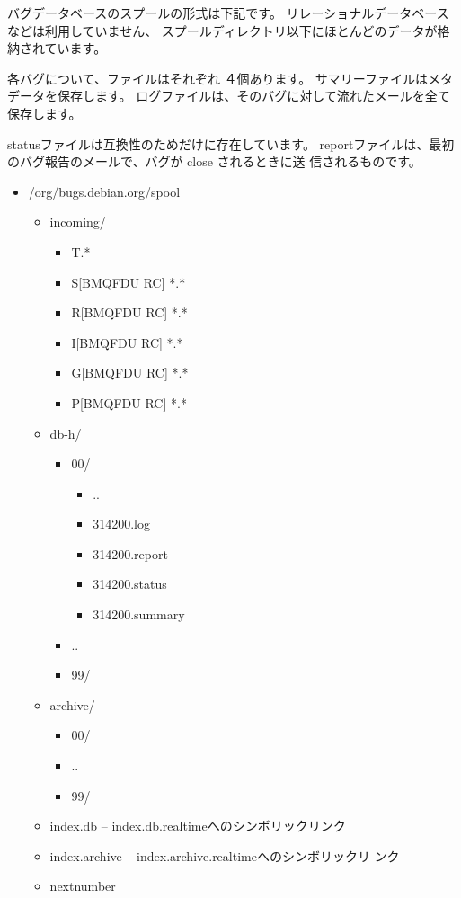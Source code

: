 \documentclass[mingoth,a4paper]{jsarticle}
\begin{document}
バグデータベースのスプールの形式は下記です。
リレーショナルデータベースなどは利用していません、
スプールディレクトリ以下にほとんどのデータが格納されています。

各バグについて、ファイルはそれぞれ
４個あります。
サマリーファイルはメタデータを保存します。
ログファイルは、そのバグに対して流れたメールを全て保存します。

statusファイルは互換性のためだけに存在しています。
reportファイルは、最初のバグ報告のメールで、バグが close されるときに送
信されるものです。

\begin{itemize}
 \item /org/bugs.debian.org/spool
       \begin{itemize}
	\item incoming/
	      \begin{itemize}
	       \item T.*
	       \item S[BMQFDU RC] *.*
	       \item R[BMQFDU RC] *.*
	       \item I[BMQFDU RC] *.*
	       \item G[BMQFDU RC] *.*
	       \item P[BMQFDU RC] *.*
	      \end{itemize}
	\item db-h/
	      \begin{itemize}
	       \item 00/
		     \begin{itemize}
		      \item ..
		      \item 314200.log
		      \item 314200.report
		      \item 314200.status
		      \item 314200.summary
		     \end{itemize}
	       \item ..
	       \item 99/
	      \end{itemize}
	\item archive/
	      \begin{itemize}
	       \item 00/
	       \item ..
	       \item 99/
	      \end{itemize}
	\item index.db -- index.db.realtimeへのシンボリックリンク
	\item index.archive -- index.archive.realtimeへのシンボリックリ
	      ンク
	\item nextnumber
       \end{itemize}
\end{itemize}
\end{document}
